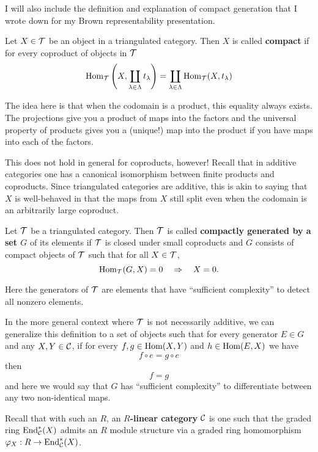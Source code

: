 \documentclass[12pt]{article}
\begin{document}
I will also include the definition and explanation of compact generation that I wrote down for my Brown representability presentation.
\begin{defn}\label{defn-compact-obj}
	Let $X\in\mathcal{T}$ be an object in a triangulated category. Then $X$ is called \textbf{compact} if for every coproduct of objects in $\mathcal{T}$
	\[\operatorname{Hom}_{\mathcal{T}}\left(X,\coprod_{\lambda\in\Lambda}t_\lambda\right)=\coprod_{\lambda\in\Lambda}\operatorname{Hom}_{\mathcal{T}}(X,t_\lambda)\]
\end{defn}
\begin{rmk}
	The idea here is that when the codomain is a product, this equality always exists. The projections give you 
	a product of maps into the factors and the universal property of products gives you a (unique!) map into the product if you
	have maps into each of the factors.

	This does not hold in general for coproducts, however! Recall that in additive categories 
	one has a canonical isomorphism between finite products and coproducts. Since triangulated 
	categories are additive, this is akin to saying that $X$ is well-behaved in that the maps 
	from $X$ still split even when the codomain is an arbitrarily large coproduct.
\end{rmk}
\begin{defn}\label{defn-compact-tricat}
	Let $\mathcal{T}$ be a triangulated category. Then $\mathcal{T}$ is called \textbf{compactly generated by a set $G$} of its elements 
	if $\mathcal{T}$ is closed under small coproducts and $G$ consists of compact objects of $\mathcal{T}$ such that for all $X\in\mathcal{T}$,
	\[\operatorname{Hom}_{\mathcal{T}}(G,X)=0\quad\Rightarrow\quad X=0.\]
\end{defn}
\begin{rmk}
	Here the generators of $\mathcal{T}$ are elements that have ``sufficient complexity'' to detect all nonzero elements. 
	
	In the more general context where $\mathcal{T}$ is not necessarily additive, we can generalize this definition to a set of objects 
	such that for every generator $E\in G$ and any $X,Y\in\mathcal{C}$, if for every $f,g\in\operatorname{Hom}(X,Y)$ and $h\in\operatorname{Hom}(E,X)$ we have 
	\[f\circ e=g\circ e\]
	then 
	\[f=g\]
	and here we would say that $G$ has ``sufficient complexity'' to differentiate between any two non-identical maps.
\end{rmk}

\begin{defn}\label{defn-R-linear-cat}
	Recall that with such an $R$, an \textbf{$R$-linear category} $\mathcal{C}$ is one such that the graded ring $\operatorname{End}^\ast_{\mathcal{C}}(X)$ admits
	an $R$ module structure via a graded ring homomorphism $\varphi_X:R\to \operatorname{End}^\ast_{\mathcal{C}}(X)$.
\end{defn}
\end{document}
